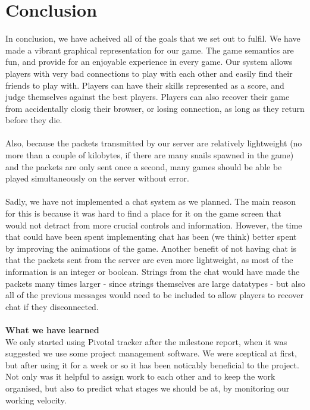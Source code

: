 \documentclass{article}
\begin{document}
\section{Conclusion}
In conclusion, we have acheived all of the goals that we set out to fulfil. We have made a vibrant graphical representation for our game. The game semantics are fun, and provide for an enjoyable experience in every game. Our system allows players with very bad connections to play with each other and easily find their friends to play with. Players can have their skills represented as a score, and judge themselves against the best players. Players can also recover  their game from accidentally closig their browser, or losing connection, as long as they return before they die. \\ \\
Also, because the packets transmitted by our server are relatively lightweight (no more than a couple of kilobytes, if there are many snails spawned in the game) and the packets are only sent once a second, many games should be able be played simultaneously on the server without error. \\ \\
Sadly, we have not implemented a chat system as we planned. The main reason for this is because it was hard to find a place for it on the game screen that would not detract from more crucial controls and information. However, the time that  could have been spent implementing chat has been (we think) better spent by improving the animations of the game. Another benefit of not having chat is that the packets sent from the server are even more lightweight, as most of the information is an integer or boolean. Strings from the chat would have made the packets many times larger - since strings themselves are large datatypes - but also all of the previous messages would need to be included to allow players to recover chat if they disconnected. \\ \\
\textbf{What we have learned} \\
We only started using Pivotal tracker after the milestone report, when it was suggested we use some project management software. We were sceptical at first, but after using it for a week or so it has been noticably beneficial to the project. Not only was it helpful to assign work to each other and to keep the work organised, but also to predict what stages we should be at, by monitoring our working velocity. \\ \\
\end{document}
